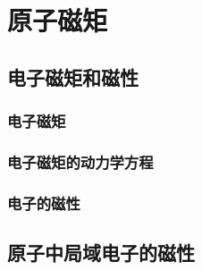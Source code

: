 \chapter{原子磁矩}



\section{电子磁矩和磁性}



\subsection{电子磁矩}



\subsection{电子磁矩的动力学方程}



\subsection{电子的磁性}



\section{原子中局域电子的磁性}